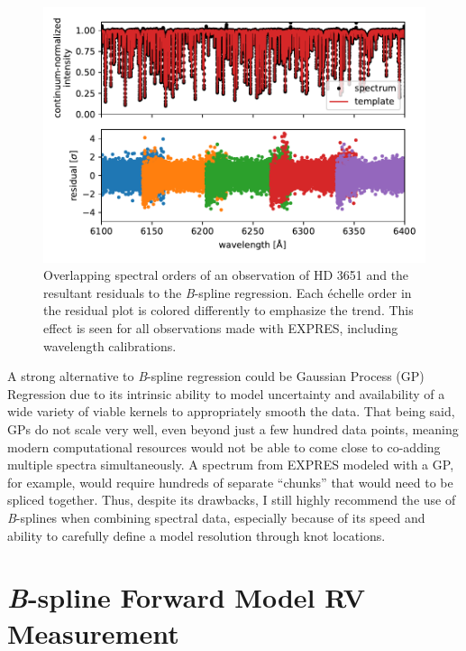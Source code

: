 \begin{figure}
    \centering
    \includegraphics[width=\textwidth]{figures-5/order-matching.pdf}
    \caption[Stellar template overlapping orders]{Overlapping spectral orders of an observation of HD 3651 and the resultant residuals to the \textit{B}-spline regression. Each \'echelle order in the residual plot is colored differently to emphasize the trend. This effect is seen for all observations made with EXPRES, including wavelength calibrations.}
    \label{fig:order-matching}
\end{figure}

A strong alternative to \textit{B}-spline regression could be Gaussian Process (GP) Regression \citep{rajpaul_robust_2020} due to its intrinsic ability to model uncertainty and availability of a wide variety of viable kernels to appropriately smooth the data. That being said, GPs do not scale very well, even beyond just a few hundred data points, meaning modern computational resources would not be able to come close to co-adding multiple spectra simultaneously. A spectrum from EXPRES modeled with a GP, for example, would require hundreds of separate ``chunks'' that would need to be spliced together. Thus, despite its drawbacks, I still highly recommend the use of \textit{B}-splines when combining spectral data, especially because of its speed and ability to carefully define a model resolution through knot locations.

\section{\textit{B}-spline Forward Model RV Measurement} \label{pipeline2:forward-model}

